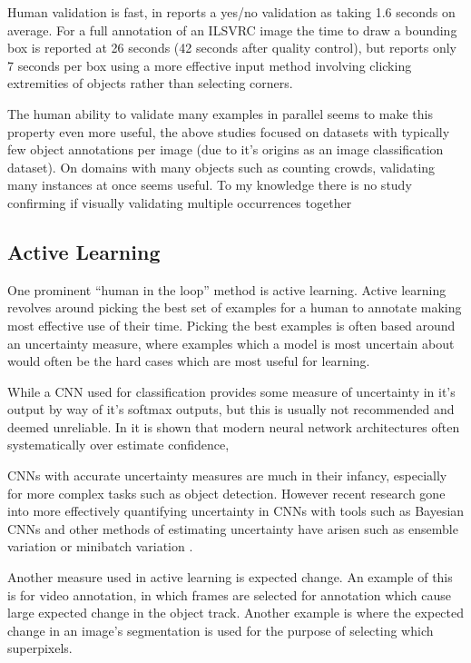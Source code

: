 Human validation is fast, in \cite{Papadopoulos2016} reports a yes/no validation as taking 1.6 seconds on average. For a full annotation of an \gls{ILSVRC} image \cite {Su2012a} the time to draw a bounding box is reported at 26 seconds (42 seconds after quality control), but \cite{Papadopoulos2017} reports only 7 seconds per box using a more effective input method involving clicking extremities of objects rather than selecting corners. 


The human ability to validate many examples in parallel seems to make this property even more useful, the above studies focused on datasets with typically few object annotations per image (due to it's origins as an image classification dataset). On domains with many objects such as counting crowds, validating many instances at once seems useful. To my knowledge there is no study confirming if visually validating multiple occurrences together 


\subsection{Active Learning}

One prominent ``human in the loop'' method is active learning. Active learning revolves around picking the best set of examples for a human to annotate making most effective use of their time. Picking the best examples is often based around an uncertainty measure, where examples which a model is most uncertain about would often be the hard cases which are most useful for learning. 
 
While a \gls{CNN} used for classification provides some measure of uncertainty in it's output by way of it's softmax outputs, but this is usually not recommended and deemed unreliable. In \cite{Guo2017} it is shown that modern neural network architectures often systematically over estimate confidence, 

\gls{CNN}s with accurate uncertainty measures are much in their infancy, especially for more complex tasks such as object detection. However recent research gone into more effectively quantifying uncertainty in \gls{CNN}s with tools such as Bayesian \gls{CNN}s \cite{Gal2017} and other methods of estimating uncertainty have arisen such as ensemble variation \cite{Beluch2018} or minibatch variation \cite{Chang2017}. 

Another measure used in active learning is expected change. An example of this is \cite{Vondrick2011} for video annotation, in which frames are selected for annotation which cause large expected change in the object track. Another example is \cite{Xu2017} where the expected change in an image's segmentation is used for the purpose of selecting which superpixels. 


